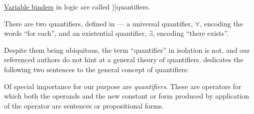 \begin{concept}\label{con:quantifier}
  \hyperref[con:variable_binding]{Variable binders} in logic are called \term[en=quantifier (\cite[41]{Church1956LogicVol1})]{quantifiers}.
\end{concept}
\begin{comments}
  \item There are two quantifiers, defined in  --- a universal quantifier, \( \forall \), encoding the words \enquote{for each}, and an existential quantifier, \( \exists \), encoding \enquote{there exists}.

  Despite them being ubiquitous, the term \enquote{quantifier} in isolation is not, and our referenced authors do not hint at a general theory of quantifiers.  dedicates the following two sentences to the general concept of quantifiers:
  \begin{displayquote}
    Of special importance for our purpose are \textit{quantifiers}. These are operators for which both the operands and the new constant or form produced by application of the operator are sentences or propositional forms.
  \end{displayquote}
\end{comments}

